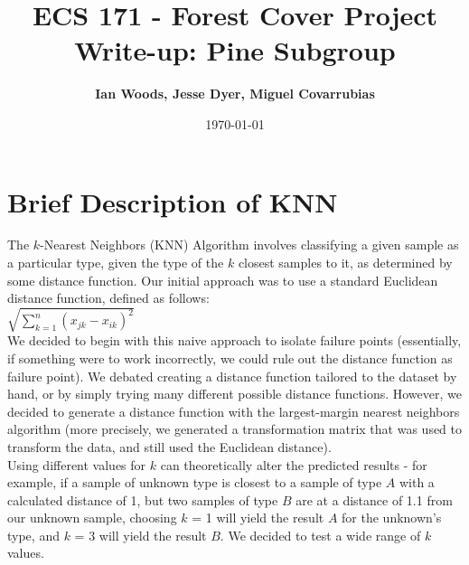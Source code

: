 \documentclass[11pt]{article}
\title{\bf ECS 171 - Forest Cover Project Write-up: Pine Subgroup\\[2ex] }
\date{\today}
\author{\bf Ian Woods, Jesse Dyer, Miguel Covarrubias}
\begin{document}
\maketitle


\section*{Brief Description of KNN} 
The $k$-Nearest Neighbors (KNN) Algorithm involves classifying a given sample as a particular type, given the type of the $k$ closest samples to it, as determined by some distance function. Our initial approach was to use a standard Euclidean distance function, defined as follows:
\\
$\sqrt{\sum\limits_{k = 1}^n (x_{jk} - x_{ik})^2}$
\\
We decided to begin with this naive approach to isolate failure points (essentially, if something were to work incorrectly, we could rule out the distance function as failure point).
We debated creating a distance function tailored to the dataset by hand, or by simply trying many different possible distance functions. However, we decided to generate a distance function with the largest-margin nearest neighbors algorithm (more precisely, we generated a transformation matrix that was used to transform the data, and still used the Euclidean distance).
\\
Using different values for $k$ can theoretically alter the predicted results - for example, if a sample of unknown type is closest to a sample of type $A$ with a calculated distance of 1, but two samples of type $B$ are at a distance of 1.1 from our unknown sample, choosing $k$ = 1 will yield the result $A$ for the unknown's type, and $k$ = 3 will yield the result $B$. We decided to test a wide range of $k$ values.
\end{document}
